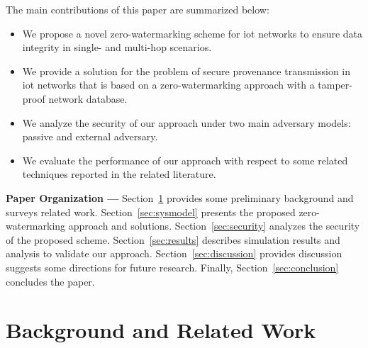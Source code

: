 \documentclass{llncs}
\begin{document}
The main contributions of this paper are summarized below:

\begin{itemize}
\item We propose a novel zero-watermarking scheme for \gls*{iot} networks to ensure data integrity in single- and multi-hop scenarios.
\item We provide a solution for the problem of secure provenance transmission in \gls*{iot} networks that is based on a zero-watermarking approach with a tamper-proof network database.
\item We analyze the security of our approach under two main adversary models: passive and external adversary.
\item We evaluate the performance of our approach with respect to some related techniques reported in the related literature. 
\end{itemize}


\noindent \textbf{Paper Organization ---} Section~\ref{sec:relatedWork} provides some preliminary background and surveys related work. Section~\ref{sec:sysmodel} presents the proposed zero-watermarking approach and solutions. Section~\ref{sec:security} analyzes the security of the proposed scheme. Section~\ref{sec:results} describes simulation results and analysis to validate our approach. Section~\ref{sec:discussion} provides discussion suggests some directions for future research. Finally, Section~\ref{sec:conclusion} concludes the paper.

\section{Background and Related Work}
\label{sec:relatedWork}
\end{document}
